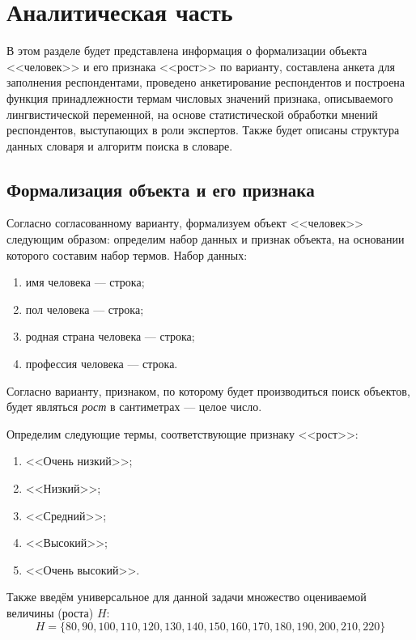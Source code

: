 \chapter{Аналитическая часть}
В этом разделе будет представлена информация о формализации объекта <<человек>> и его признака <<рост>> по варианту, составлена анкета для заполнения респондентами, проведено анкетирование респондентов и построена функция принадлежности термам числовых значений признака, описываемого лингвистической переменной, на основе статистической обработки мнений респондентов, выступающих в роли экспертов.
Также будет описаны структура данных словаря и алгоритм поиска в словаре. 

\section{Формализация объекта и его признака}
\label{formal}
Согласно согласованному варианту, формализуем объект <<человек>> следующим образом: определим набор данных и признак объекта, на основании которого составим набор термов.
Набор данных:
\begin{enumerate}[label=\arabic*)]
	\item имя человека --- строка;
	\item пол человека --- строка;
	\item родная страна человека --- строка;
	\item профессия человека --- строка.
\end{enumerate}
Согласно варианту, признаком, по которому будет производиться поиск объектов, будет являться \textit{рост} в сантиметрах --- целое число.

Определим следующие термы, соответствующие признаку <<рост>>:
\begin{enumerate}[label=\arabic*)]
	\item <<Очень низкий>>;
	\item <<Низкий>>;
	\item <<Средний>>;
	\item <<Высокий>>;
	\item <<Очень высокий>>.
\end{enumerate}

Также введём универсальное для данной задачи множество оцениваемой величины (роста) $H$:
\begin{equation}
	\label{eq:h}
	H = \{80, 90, 100, 110, 120, 130, 140, 150, 160, 170, 180, 190, 200, 210, 220\}
\end{equation}

